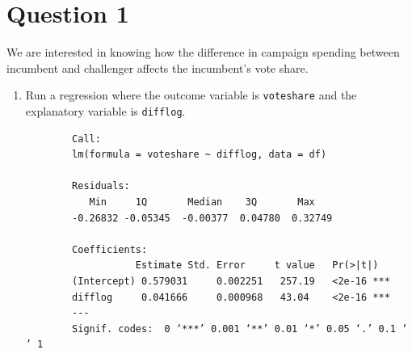 \documentclass[12pt,letterpaper]{article}
\begin{document}
\section*{Question 1}
\vspace{.25cm}
\noindent We are interested in knowing how the difference in campaign spending between incumbent and challenger affects the incumbent's vote share. 
	\begin{enumerate}
		\item Run a regression where the outcome variable is \texttt{voteshare} and the explanatory variable is \texttt{difflog}.	
		
		\begin{verbatim}
		Call:
		lm(formula = voteshare ~ difflog, data = df)
		
		Residuals:
		   Min     1Q       Median    3Q       Max 
		-0.26832 -0.05345  -0.00377  0.04780  0.32749 
		
		Coefficients:
		           Estimate Std. Error     t value   Pr(>|t|)    
		(Intercept) 0.579031     0.002251   257.19   <2e-16 ***
		difflog     0.041666     0.000968   43.04    <2e-16 ***
		---
		Signif. codes:  0 ‘***’ 0.001 ‘**’ 0.01 ‘*’ 0.05 ‘.’ 0.1 ‘ ’ 1
		

\end{verbatim}
\end{enumerate}
\end{document}
